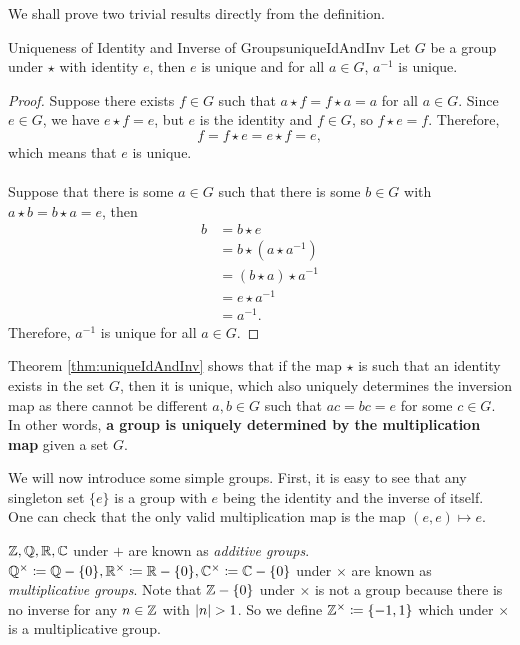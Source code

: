 \documentclass[math, code]{amznotes}
\theoremstyle{remark}
\begin{document}
We shall prove two trivial results directly from the definition.
\begin{thmbox}{Uniqueness of Identity and Inverse of Groups}{uniqueIdAndInv}
    Let $G$ be a group under $\star$ with identity $e$, then $e$ is unique and for all $a \in G$, $a^{-1}$ is unique.
    \tcblower
    \begin{proof}
        Suppose there exists $f \in G$ such that $a \star f = f \star a = a$ for all $a \in G$. Since $e \in G$, we have $e \star f = e$, but $e$ is the identity and $f \in G$, so $f \star e = f$. Therefore,
        \begin{equation*}
            f = f \star e = e \star f = e,
        \end{equation*}
        which means that $e$ is unique.
        \\\\
        Suppose that there is some $a \in G$ such that there is some $b \in G$ with $a \star b = b \star a = e$, then
        \begin{align*}
            b & = b \star e \\
            & = b \star \left(a \star a^{-1}\right) \\
            & = \left(b \star a\right) \star a^{-1} \\
            & = e \star a^{-1} \\
            & = a^{-1}.
        \end{align*}
        Therefore, $a^{-1}$ is unique for all $a \in G$.
    \end{proof}
\end{thmbox}
Theorem \ref{thm:uniqueIdAndInv} shows that if the map $\star$ is such that an identity exists in the set $G$, then it is unique, which also uniquely determines the inversion map as there cannot be different $a, b \in G$ such that $ac = bc = e$ for some $c \in G$. In other words, \textbf{a group is uniquely determined by the multiplication map} given a set $G$.

We will now introduce some simple groups. First, it is easy to see that any singleton set $\{e\}$ is a group with $e$ being the identity and the inverse of itself. One can check that the only valid multiplication map is the map $(e, e) \mapsto e$.

$\mathbb{Z}, \mathbb{Q}, \mathbb{R}, \mathbb{C}$ under $+$ are known as \textit{additive groups}. $\mathbb{Q}^{\times} \coloneqq \mathbb{Q} - \{0\},\mathbb{R}^{\times} \coloneqq \mathbb{R} - \{0\}, \mathbb{C}^{\times} \coloneqq \mathbb{C} - \{0\}$ under $\times$ are known as \textit{multiplicative groups}. Note that $\mathbb{Z} - \{0\}$ under $\times$ is not a group because there is no inverse for any $n \in \mathbb{Z}$ with ${\left\lvert {n} \right\rvert} > 1$. So we define $\mathbb{Z}^{\times} \coloneqq \{-1, 1\}$ which under $\times$ is a multiplicative group.
\end{document}
